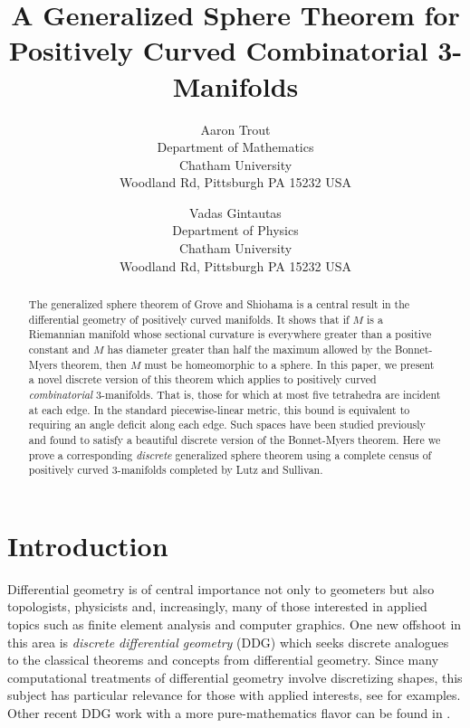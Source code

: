 \documentclass[12pt]{article}
\begin{document}
\nocite{*}

\title{A Generalized Sphere Theorem for Positively Curved Combinatorial 3-Manifolds}

\author{Aaron Trout \\ Department of Mathematics \\
Chatham University \\ Woodland Rd, Pittsburgh PA 15232 USA \and
Vadas Gintautas\\ Department of Physics \\
Chatham University \\ Woodland Rd, Pittsburgh PA 15232 USA}


\maketitle

\begin{abstract}
The generalized sphere theorem of Grove and Shiohama is a central result in the differential geometry of positively curved manifolds. It shows that if $M$ is a Riemannian manifold whose sectional curvature is everywhere greater than a positive constant and $M$ has diameter greater than half the maximum allowed by the Bonnet-Myers theorem, then $M$ must be homeomorphic to a sphere. In this paper, we present a novel discrete version of this theorem which applies to positively curved {\em combinatorial} 3-manifolds. That is, those for which at most five tetrahedra are incident at each edge. In the standard piecewise-linear metric, this bound is equivalent to requiring an angle deficit along each edge. Such spaces have been studied previously and found to satisfy a beautiful discrete version of the Bonnet-Myers theorem. Here we prove a corresponding {\em discrete} generalized sphere theorem using a complete census of positively curved 3-manifolds completed by Lutz and Sullivan.
\end{abstract}


\section{Introduction}

Differential geometry is of central importance not only to geometers but also topologists, physicists and, increasingly, many of those interested in applied topics such as finite element analysis and computer graphics. One new offshoot in this area is {\em discrete differential geometry} (DDG) which seeks discrete analogues to the classical theorems and concepts from differential geometry. Since many computational treatments of differential geometry involve discretizing shapes, this subject has particular relevance for those with applied interests, see \cite{grinspun2006discrete} for examples. Other recent DDG work with a more pure-mathematics flavor can be found in \cite{BMM,Crowley,EMM,forman2,GGL1,GGL2,GGL3,stone}. 
\end{document}
